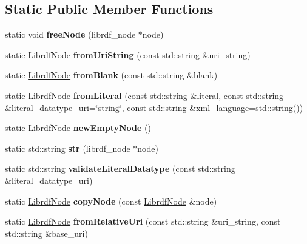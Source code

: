 \subsection*{Static Public Member Functions}
\begin{DoxyCompactItemize}
\item 
\mbox{\label{classredland_1_1LibrdfNode_a5c971e6daeca94c4eabddfa5f6e4c456}} 
static void {\bfseries free\+Node} (librdf\+\_\+node $\ast$node)
\item 
\mbox{\label{classredland_1_1LibrdfNode_aacf853ee60f9d706bc7e95fb426166bd}} 
static \hyperlink{classredland_1_1LibrdfNode}{Librdf\+Node} {\bfseries from\+Uri\+String} (const std\+::string \&uri\+\_\+string)
\item 
\mbox{\label{classredland_1_1LibrdfNode_a22ea96262be432e6abb5c1e28ede3071}} 
static \hyperlink{classredland_1_1LibrdfNode}{Librdf\+Node} {\bfseries from\+Blank} (const std\+::string \&blank)
\item 
\mbox{\label{classredland_1_1LibrdfNode_a346fad618a010ef983ce24d62891de0e}} 
static \hyperlink{classredland_1_1LibrdfNode}{Librdf\+Node} {\bfseries from\+Literal} (const std\+::string \&literal, const std\+::string \&literal\+\_\+datatype\+\_\+uri=\char`\"{}string\char`\"{}, const std\+::string \&xml\+\_\+language=std\+::string())
\item 
\mbox{\label{classredland_1_1LibrdfNode_aaeeeca26bafdaf7f118af3307a4768be}} 
static \hyperlink{classredland_1_1LibrdfNode}{Librdf\+Node} {\bfseries new\+Empty\+Node} ()
\item 
\mbox{\label{classredland_1_1LibrdfNode_aa6bf7e25e68e473f2f39cb7b4cb5f39b}} 
static std\+::string {\bfseries str} (librdf\+\_\+node $\ast$node)
\item 
\mbox{\label{classredland_1_1LibrdfNode_a3242e29edb736ba0aa8ac42fd6b3ae58}} 
static std\+::string {\bfseries validate\+Literal\+Datatype} (const std\+::string \&literal\+\_\+datatype\+\_\+uri)
\item 
\mbox{\label{classredland_1_1LibrdfNode_a46208d163a49bc7640a8b4c847e2a28b}} 
static \hyperlink{classredland_1_1LibrdfNode}{Librdf\+Node} {\bfseries copy\+Node} (const \hyperlink{classredland_1_1LibrdfNode}{Librdf\+Node} \&node)
\item 
\mbox{\label{classredland_1_1LibrdfNode_a872032a7516dd140f93a9f4af3e0abd9}} 
static \hyperlink{classredland_1_1LibrdfNode}{Librdf\+Node} {\bfseries from\+Relative\+Uri} (const std\+::string \&uri\+\_\+string, const std\+::string \&base\+\_\+uri)
\end{DoxyCompactItemize}


